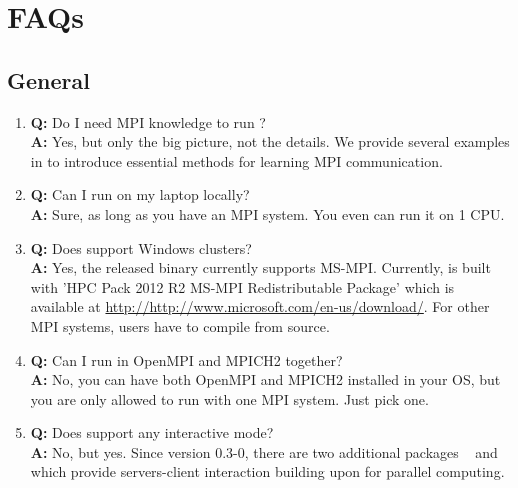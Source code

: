 

\section[FAQs]{FAQs}
\label{sec:faqs}


\subsection[General]{General}
\label{sec:general}

\begin{enumerate}
\item {\bf\color{blue} Q:}
      Do I need MPI knowledge to run ? \\
      {\bf\color{blue} A:}
      Yes, but only the big picture, not the details. We provide
      several examples in  to
      introduce essential methods for learning MPI communication.

\item {\bf\color{blue} Q:}
      Can I run  on my laptop locally? \\
      {\bf\color{blue} A:}
      Sure, as long as you have an MPI system. You even can run it on 1 CPU.

\item {\bf\color{blue} Q:}
      Does  support Windows clusters? \\
      {\bf\color{blue} A:}
      Yes, the released binary currently supports MS-MPI.
      Currently,  is built with
      'HPC Pack 2012 R2 MS-MPI Redistributable Package' which is available
      at \url{http://http://www.microsoft.com/en-us/download/}.
      For other MPI systems, users have to compile from source.

\item {\bf\color{blue} Q:}
      Can I run  in OpenMPI and MPICH2 together? \\
      {\bf\color{blue} A:}
      No, you can have both OpenMPI and MPICH2 installed in your OS, but
      you are only allowed to run  with one MPI system.
      Just pick one.

\item {\bf\color{blue} Q:}
      Does  support any interactive mode? \\
      {\bf\color{blue} A:}
      No, but yes. Since  version 0.3-0, there are two additional
      packages ~\citep{Chen2015pbdZMQpackage} and
      ~\citep{Schmidt2015pbdCSpackage}
      which provide servers-client interaction building upon
       for parallel computing.


\end{enumerate}
